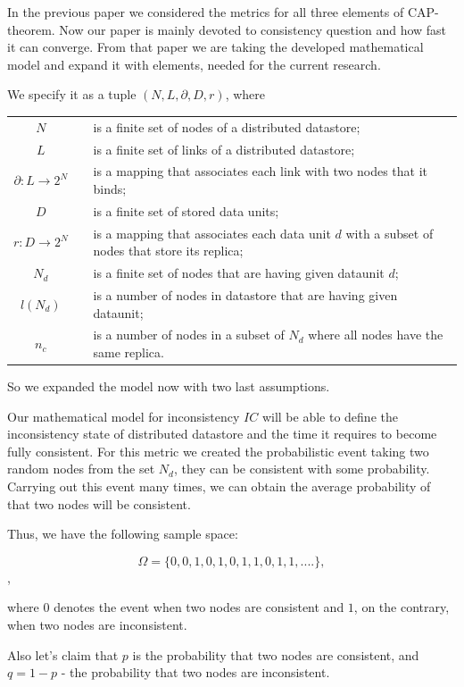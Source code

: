 \documentclass{llncs}
\begin{document}
In the previous paper \cite{bib:prob_approach} we considered the metrics for all three elements of CAP-theorem.
Now our paper is mainly devoted to consistency question and how fast it can converge.
From that paper we are taking the developed mathematical model and expand it with elements, needed for the current research.

We specify it as a tuple $(N, L, \partial,D, r)$, where \\
\begin{tabular*}{\textwidth}{cp{0.5cm}p{}}
$N$&& is a finite set of nodes of a distributed datastore; \\
$L$&& is a finite set of links of a distributed datastore; \\
$\partial:L\rightarrow 2^N$&& is a mapping that associates each link with two nodes that it binds;\\
$D$&& is a finite set of stored data units;\\
$r:D\rightarrow 2^N$&& is a mapping that associates each data unit $d$ with a subset of nodes 
that store its replica; \\


$N_d$&& is a finite set of nodes that are having given dataunit $d$; \\
$l(N_d)$&& is a number of nodes in datastore that are having given dataunit; \\
$n_c$&& is a number of nodes in a subset of $N_d$ where all nodes have the same replica.
\end{tabular*}

So we expanded the model now with two last assumptions.

Our mathematical model for inconsistency $IC$ will be able to define the inconsistency state of distributed datastore and the time it requires to become fully consistent.
For this metric we created the probabilistic event taking two random nodes from the set $N_d$, they can be consistent with some probability. Carrying out this event many times, we can obtain the average probability of that two nodes will be consistent.


Thus, we have the following sample space:

\[\Omega = \{0, 0, 1, 0, 1, 0, 1 , 1, 0, 1, 1, ....\}, \],

where $0$ denotes the event when two nodes are consistent and $1$, on the contrary, when two nodes are inconsistent.

Also let's claim that $p$ is the probability that two nodes are consistent, and
$q = 1 -p$ - the probability that two nodes are inconsistent.
\end{document}
